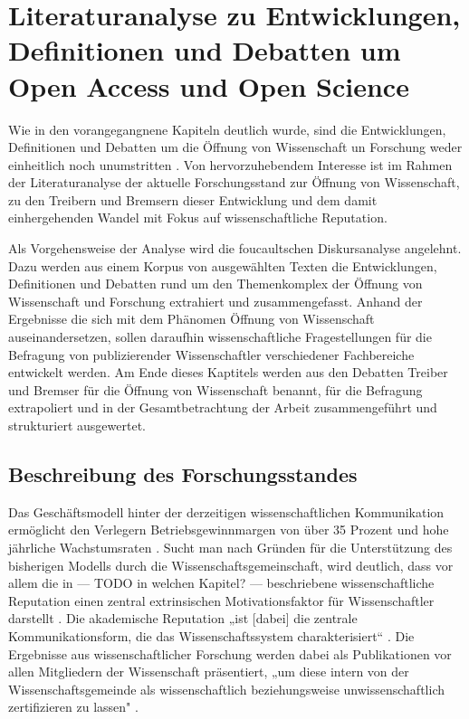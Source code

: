 \chapter{Literaturanalyse zu Entwicklungen, Definitionen und Debatten um Open Access und Open Science}
Wie in den vorangegangnene Kapiteln deutlich wurde, sind die Entwicklungen, Definitionen und Debatten um die Öffnung von Wissenschaft un Forschung weder einheitlich noch unumstritten \cite{muller_2010_open} \cite{schulze_2013_open}. Von hervorzuhebendem Interesse ist im Rahmen der Literaturanalyse der aktuelle Forschungsstand zur Öffnung von Wissenschaft, zu den Treibern und Bremsern dieser Entwicklung und dem damit einhergehenden Wandel mit Fokus auf wissenschaftliche Reputation. 

Als Vorgehensweise der Analyse wird die foucaultschen Diskursanalyse angelehnt. Dazu werden aus einem Korpus von ausgewählten Texten die Entwicklungen, Definitionen und Debatten rund um den Themenkomplex der Öffnung von Wissenschaft und Forschung extrahiert und zusammengefasst. Anhand der Ergebnisse die sich mit dem Phänomen Öffnung von Wissenschaft auseinandersetzen, sollen daraufhin wissenschaftliche Fragestellungen für die Befragung von publizierender Wissenschaftler verschiedener Fachbereiche entwickelt werden. Am Ende dieses Kaptitels werden aus den Debatten Treiber und Bremser für die Öffnung von Wissenschaft benannt, für die Befragung extrapoliert und in der Gesamtbetrachtung der Arbeit zusammengeführt und strukturiert ausgewertet.

\section{Beschreibung des Forschungsstandes}
Das Geschäftsmodell hinter der derzeitigen wissenschaftlichen Kommunikation ermöglicht den Verlegern Betriebsgewinnmargen von über 35 Prozent \cite{russell_2008_business} und hohe jährliche Wachstumsraten \cite{Wellcome_Trust_2003}. Sucht man nach Gründen für die Unterstützung des bisherigen Modells durch die Wissenschaftsgemeinschaft, wird deutlich, dass vor allem die in --- TODO in welchen Kapitel? --- beschriebene wissenschaftliche Reputation einen zentral extrinsischen Motivationsfaktor für Wissenschaftler darstellt \cite{minssen_2012_arbeit}. Die akademische Reputation „ist [dabei] die zentrale Kommunikationsform, die das Wissenschaftssystem charakterisiert“ \cite{Rutenfranz_1997}. Die Ergebnisse aus wissenschaftlicher Forschung werden dabei als Publikationen vor allen Mitgliedern der Wissenschaft präsentiert, „um diese intern von der Wissenschaftsgemeinde als wissenschaftlich beziehungsweise unwissenschaftlich zertifizieren zu lassen" \cite{Rutenfranz_1997}.

